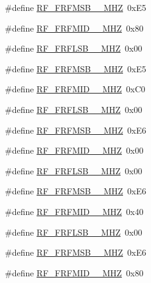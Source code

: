 \begin{DoxyCompactItemize}
\item 
\#define \mbox{\hyperlink{sx1276_regs-_fsk_8h_a78d8d7e3f4451c2badb7f3359916d743}{R\+F\+\_\+\+F\+R\+F\+M\+S\+B\+\_\+\_\+\+M\+HZ}}~0x\+E5
\item 
\#define \mbox{\hyperlink{sx1276_regs-_fsk_8h_a1546e90f6f3410863a32080331820bbf}{R\+F\+\_\+\+F\+R\+F\+M\+I\+D\+\_\+\_\+\+M\+HZ}}~0x80
\item 
\#define \mbox{\hyperlink{sx1276_regs-_fsk_8h_a9ff02de3ac5b8834425db22bd9c08aa0}{R\+F\+\_\+\+F\+R\+F\+L\+S\+B\+\_\+\_\+\+M\+HZ}}~0x00
\item 
\#define \mbox{\hyperlink{sx1276_regs-_fsk_8h_aa5948b0994ec297dab348596c157f83e}{R\+F\+\_\+\+F\+R\+F\+M\+S\+B\+\_\+\_\+\+M\+HZ}}~0x\+E5
\item 
\#define \mbox{\hyperlink{sx1276_regs-_fsk_8h_aa290b930290cc4e553b4ab66ae76110d}{R\+F\+\_\+\+F\+R\+F\+M\+I\+D\+\_\+\_\+\+M\+HZ}}~0x\+C0
\item 
\#define \mbox{\hyperlink{sx1276_regs-_fsk_8h_a5015a2c3439f35865780ba16fefb1493}{R\+F\+\_\+\+F\+R\+F\+L\+S\+B\+\_\+\_\+\+M\+HZ}}~0x00
\item 
\#define \mbox{\hyperlink{sx1276_regs-_fsk_8h_ac8513596ed36e9470cbeb19a1e8e9951}{R\+F\+\_\+\+F\+R\+F\+M\+S\+B\+\_\+\_\+\+M\+HZ}}~0x\+E6
\item 
\#define \mbox{\hyperlink{sx1276_regs-_fsk_8h_ac4e4c5efd901db32fc8ba24c6875d05f}{R\+F\+\_\+\+F\+R\+F\+M\+I\+D\+\_\+\_\+\+M\+HZ}}~0x00
\item 
\#define \mbox{\hyperlink{sx1276_regs-_fsk_8h_a43714471acd2a688c20cdd6b5eedaa35}{R\+F\+\_\+\+F\+R\+F\+L\+S\+B\+\_\+\_\+\+M\+HZ}}~0x00
\item 
\#define \mbox{\hyperlink{sx1276_regs-_fsk_8h_a3b3f235e4db9c9622527591ca7916c87}{R\+F\+\_\+\+F\+R\+F\+M\+S\+B\+\_\+\_\+\+M\+HZ}}~0x\+E6
\item 
\#define \mbox{\hyperlink{sx1276_regs-_fsk_8h_a0ac29b7ceadd42ee420ff9edfe9e8e79}{R\+F\+\_\+\+F\+R\+F\+M\+I\+D\+\_\+\_\+\+M\+HZ}}~0x40
\item 
\#define \mbox{\hyperlink{sx1276_regs-_fsk_8h_a1f2bb1e7bc8fbd6e621de9eba5c86f91}{R\+F\+\_\+\+F\+R\+F\+L\+S\+B\+\_\+\_\+\+M\+HZ}}~0x00
\item 
\#define \mbox{\hyperlink{sx1276_regs-_fsk_8h_a963d533d9223136c79c216730aa5652a}{R\+F\+\_\+\+F\+R\+F\+M\+S\+B\+\_\+\_\+\+M\+HZ}}~0x\+E6
\item 
\#define \mbox{\hyperlink{sx1276_regs-_fsk_8h_a8a4cffed719d7412c18649f04f7b5c5e}{R\+F\+\_\+\+F\+R\+F\+M\+I\+D\+\_\+\_\+\+M\+HZ}}~0x80

\end{DoxyCompactItemize}
